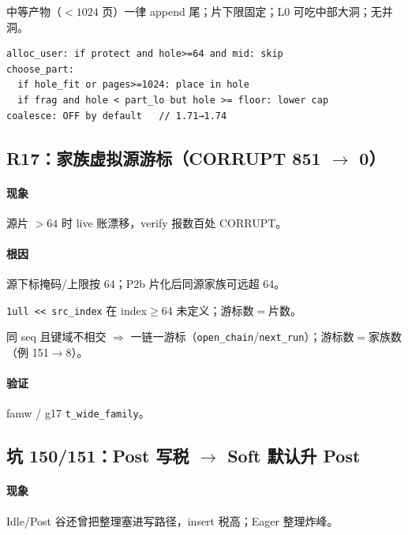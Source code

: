 \begin{fixold}
中等产物（$<1024$ 页）一律 append 尾；片下限固定；L0 可吃中部大洞；无并洞。
\end{fixold}

\begin{fixnew}
\begin{lstlisting}[language=pseudo]
alloc_user: if protect and hole>=64 and mid: skip
choose_part:
  if hole_fit or pages>=1024: place in hole
  if frag and hole < part_lo but hole >= floor: lower cap
coalesce: OFF by default   // 1.71→1.74
\end{lstlisting}
\end{fixnew}

\subsection{R17：家族虚拟源游标（CORRUPT 851 $\to$ 0）}
\paragraph{现象}
源片 $>64$ 时 live 账漂移，verify 报数百处 CORRUPT。

\paragraph{根因}
源下标掩码/上限按 64；P2b 片化后同源家族可远超 64。

\begin{fixold}
\texttt{1ull << src\_index} 在 index$\ge$64 未定义；游标数$=$片数。
\end{fixold}

\begin{fixnew}
同 seq 且键域不相交 $\Rightarrow$ 一链一游标（\texttt{open\_chain}/\texttt{next\_run}）；游标数$=$家族数（例 151$\to$8）。
\end{fixnew}

\paragraph{验证}
famw / g17 \texttt{t\_wide\_family}。

\subsection{坑 150/151：Post 写税 $\to$ Soft 默认升 Post}
\paragraph{现象}
Idle/Post 谷还曾把整理塞进写路径，insert 税高；Eager 整理炸峰。

